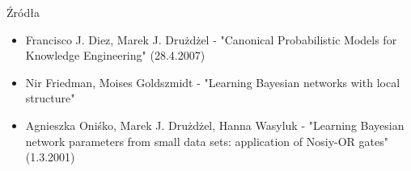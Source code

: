\documentclass{beamer}
\begin{document}
\begin{frame}{Źródła}
	\begin{itemize}
		\item Francisco J. Diez, Marek J. Drużdżel - "Canonical Probabilistic Models for Knowledge Engineering" (28.4.2007)
		\item Nir Friedman, Moises Goldszmidt - "Learning Bayesian networks with local structure"
		\item Agnieszka Oniśko, Marek J. Drużdżel, Hanna Wasyluk - "Learning Bayesian network parameters from small data sets: application of Nosiy-OR gates" (1.3.2001)
	\end{itemize}
\end{frame}
\end{document}
